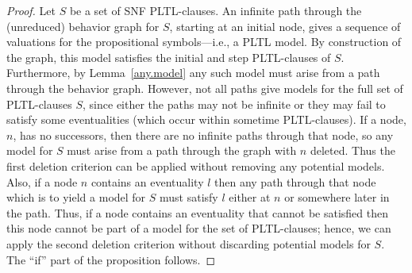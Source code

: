\documentclass[nohyperref]{acmtrans2f}
\begin{document}
\begin{proof}
Let $S$ be a set of SNF PLTL-clauses. An infinite path through the
(unreduced) behavior graph for $S$, starting at an initial node, gives
a sequence of valuations for the propositional symbols---i.e., a PLTL model. By
construction of the graph, this model satisfies the initial and step
PLTL-clauses of $S$. Furthermore, by Lemma~\ref{any.model} any such model
must arise from a path 
through the behavior graph. However, not all paths give models for
the full set of PLTL-clauses $S$, since either the paths may not be infinite or
they may fail to satisfy some 
eventualities (which occur within sometime PLTL-clauses). If a node, $n$, has
no successors, then there are no infinite paths through that node, so
any model for $S$ must arise from a path through the graph with $n$
deleted. Thus the first deletion criterion can be applied without removing
any potential models. Also, if a node $n$ contains an eventuality $l$ then
any path 
through that node which is to yield a model for $S$ must satisfy $l$
either at $n$ or somewhere later in the path. 
Thus, if a node contains an eventuality that cannot be satisfied then this
node cannot be part of a model for the set of PLTL-clauses; hence, we can apply
the second deletion criterion without discarding 
potential models for $S$. The ``if'' part of the proposition follows.


\end{proof}
\end{document}
